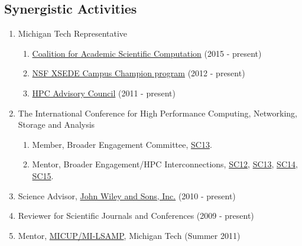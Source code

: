 %
\subsection*{Synergistic Activities}

\begin{enumerate}
  \item \textsf{Michigan Tech Representative}
        \begin{enumerate}
          \item \href{http://casc.org}{Coalition for Academic Scientific Computation} (2015 - present)
          \item \href{http://xsede.org}{NSF XSEDE Campus Champion program} (2012 - present)
          \item \href{http://hpcadvisorycouncil.com}{HPC Advisory Council} (2011 - present)
        \end{enumerate}

  \item \textsf{The International Conference for High Performance Computing,
        Networking, Storage and Analysis}
        \begin{enumerate}
          \item \textsf{Member}, Broader Engagement Committee, \href{http://sc13.supercomputing.org/}{SC13}.
          \item \textsf{Mentor}, Broader Engagement/HPC Interconnections, \href{http://sc12.supercomputing.org/}{SC12},  \href{http://sc13.supercomputing.org/}{SC13}, \href{http://sc14.supercomputing.org/}{SC14}, \href{http://sc15.supercomputing.org/}{SC15}.
        \end{enumerate}

  \item Science Advisor, \href{http://exchanges.wiley.com/advisors}{John Wiley and Sons, Inc.} (2010 - present)

  \item Reviewer for Scientific Journals and Conferences (2009 - present)

  \item Mentor, \href{http://www.mtu.edu/diversity-center/programs/students/micup-milsamp/}{MICUP/MI-LSAMP}, Michigan Tech (Summer 2011)
\end{enumerate}
